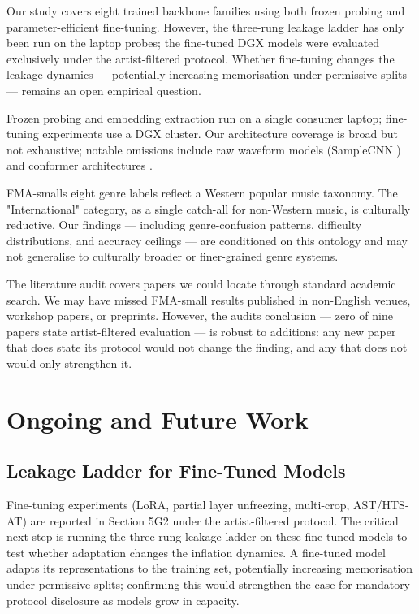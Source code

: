 \documentclass[conference]{IEEEtran}
\begin{document}
Our study covers eight trained backbone families using both frozen
probing and parameter-efficient fine-tuning. However, the three-rung
leakage ladder has only been run on the laptop probes; the fine-tuned
DGX models were evaluated exclusively under the artist-filtered
protocol. Whether fine-tuning changes the leakage dynamics ---
potentially increasing memorisation under permissive splits ---
remains an open empirical question.

Frozen probing and embedding extraction run on a single consumer laptop;
fine-tuning experiments use a DGX cluster. Our architecture coverage is
broad but not exhaustive; notable omissions include raw waveform models
(SampleCNN \citep{lee2018samplecnn}) and conformer architectures
\citep{gulati2020conformer}.

FMA-small\textquotesingle s eight genre labels reflect a Western popular
music taxonomy. The "International" category, as a single catch-all for
non-Western music, is culturally reductive. Our findings ---
including genre-confusion patterns, difficulty distributions, and
accuracy ceilings --- are conditioned on this ontology and may not
generalise to culturally broader or finer-grained genre systems.

The literature audit covers papers we could locate through standard
academic search. We may have missed FMA-small results published in
non-English venues, workshop papers, or preprints. However, the
audit\textquotesingle s conclusion --- zero of nine papers state
artist-filtered evaluation --- is robust to additions: any new paper
that does state its protocol would not change the finding, and any that
does not would only strengthen it.

\section{Ongoing and Future Work}\label{ongoing-and-future-work}

\subsection{Leakage Ladder for Fine-Tuned
Models}\label{a.-leakage-ladder-for-fine-tuned-models}

Fine-tuning experiments (LoRA, partial layer unfreezing, multi-crop,
AST/HTS-AT) are reported in Section 5G2 under the artist-filtered
protocol. The critical next step is running the three-rung leakage
ladder on these fine-tuned models to test whether adaptation changes the
inflation dynamics. A fine-tuned model adapts its representations to the
training set, potentially increasing memorisation under permissive
splits; confirming this would strengthen the case for mandatory protocol
disclosure as models grow in capacity.
\end{document}
